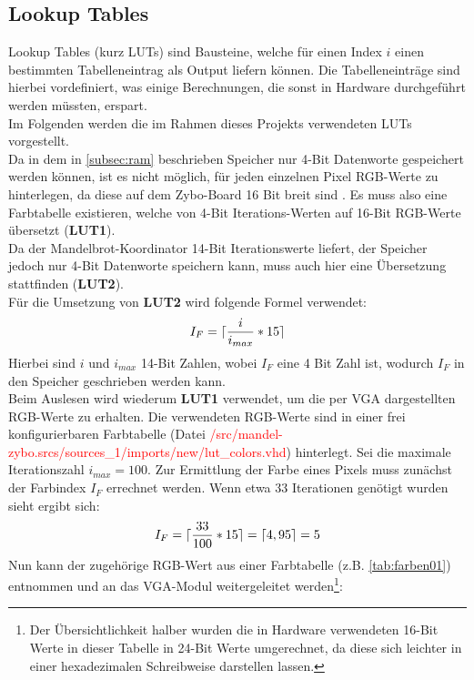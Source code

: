 \documentclass[a4paper,12pt,onesided]{report}
\begin{document}
\subsection{Lookup Tables}
\label{subsec:luts}
Lookup Tables (kurz LUTs) sind Bausteine, welche für einen Index $i$ einen bestimmten Tabelleneintrag als Output liefern können.
Die Tabelleneinträge sind hierbei vordefiniert, was einige Berechnungen, die sonst in Hardware durchgeführt werden müssten, erspart.\\
Im Folgenden werden die im Rahmen dieses Projekts verwendeten LUTs vorgestellt.\\
Da in dem in \autoref{subsec:ram} beschrieben Speicher nur 4-Bit Datenworte gespeichert werden können, ist es nicht möglich, für jeden einzelnen Pixel RGB-Werte zu hinterlegen, da diese auf dem Zybo-Board 16 Bit breit sind \cite{zyboref}. Es muss also eine Farbtabelle existieren, welche von 4-Bit Iterations-Werten auf 16-Bit RGB-Werte übersetzt (\textbf{LUT1}).\\
Da der Mandelbrot-Koordinator 14-Bit Iterationswerte liefert, der Speicher jedoch nur 4-Bit %
Datenworte speichern kann, muss auch hier eine Übersetzung stattfinden (\textbf{LUT2}).\\
Für die Umsetzung von \textbf{LUT2} wird folgende Formel verwendet:
\[I_F = \lceil\frac{i}{i_{max}}*15\rceil\]
Hierbei sind $i$ und $i_{max}$ 14-Bit Zahlen, wobei $I_F$ eine 4 Bit Zahl ist, wodurch $I_F$ in den Speicher geschrieben werden kann.\\
Beim Auslesen wird wiederum \textbf{LUT1} verwendet, um die per VGA dargestellten RGB-Werte zu erhalten.
Die verwendeten RGB-Werte sind in einer frei konfigurierbaren Farbtabelle (Datei \textcolor{red}{/src/mandel-zybo.srcs/sources\_1/imports/new/lut\_colors.vhd}) hinterlegt.
Sei die maximale Iterationszahl $i_{max} = 100$.
Zur Ermittlung der Farbe eines Pixels muss zunächst der Farbindex $I_F$ errechnet werden. Wenn etwa 33 Iterationen genötigt wurden sieht ergibt sich:
\[I_F = \lceil\frac{33}{100}*15\rceil = \lceil4,95\rceil = 5\]
Nun kann der zugehörige RGB-Wert aus einer Farbtabelle (z.B. \autoref{tab:farben01}) entnommen und an das VGA-Modul weitergeleitet werden\footnote{Der Übersichtlichkeit halber wurden die in Hardware verwendeten 16-Bit Werte in dieser Tabelle in 24-Bit Werte umgerechnet, da diese sich leichter in einer hexadezimalen Schreibweise darstellen lassen.}:
\end{document}
